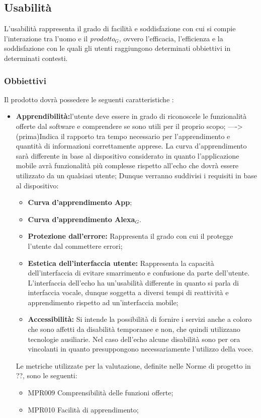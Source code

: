 \subsection{Usabilità}
L'usabilità rappresenta il grado di facilità e soddisfazione con cui si compie l'interazione tra l'uomo e il \textit{prodotto$_{G}$}, ovvero l'efficacia, l'efficienza e la soddisfazione con le quali gli utenti raggiungono determinati obbiettivi in determinati contesti.
\subsubsection{Obbiettivi } Il prodotto dovrà possedere le seguenti caratteristiche :
\begin{itemize}
	\item \textbf{Apprendibilità:}l'utente deve essere in grado di riconoscele le funzionalità offerte dal software e comprendere se sono utili per il proprio scopo; ---->(prima)Indica il rapporto tra tempo necessario per l'apprendimento e quantità di informazioni correttamente apprese.
	La curva d'apprendimento sarà differente in base al dispositivo considerato in quanto l'applicazione mobile avrà funzionalità più complesse rispetto all'echo che dovrà essere utilizzato da un qualsiasi utente; Dunque verranno suddivisi i requisiti in base al dispositivo:
	\begin{itemize}
		\item \textbf{Curva d'apprendimento App};
		\item \textbf{Curva d'apprendimento Alexa$_{G}$}.
		\item \textbf{Protezione dall'errore:} Rappresenta il grado con cui il protegge l'utente dal commettere errori;
		\item \textbf{Estetica dell'interfaccia utente:} Rappresenta la capacità dell'interfaccia di evitare smarrimento e confusione da parte dell'utente.
		L'interfaccia dell'echo ha un'usabilità differente in quanto si parla di interfaccia vocale, dunque soggetta a diversi tempi di reattività e apprendimento rispetto ad un'interfaccia mobile;
		\item \textbf{Accessibilità:} Si intende la possibilità di fornire i servizi anche a coloro che sono affetti da disabilità temporanee e non, che quindi utilizzano tecnologie ausiliarie.
		Nel caso dell'echo alcune disabilità sono per ora vincolanti in quanto presuppongono necessariamente l'utilizzo della voce.
	\end{itemize}
	Le metriche utilizzate per la valutazione, definite nelle Norme di progetto in ??, sono le seguenti:
	\begin{itemize}
		\item MPR009 Comprensibilità delle funzioni offerte;
		\item MPR010 Facilità di apprendimento;
	\end{itemize}
\end{itemize}

